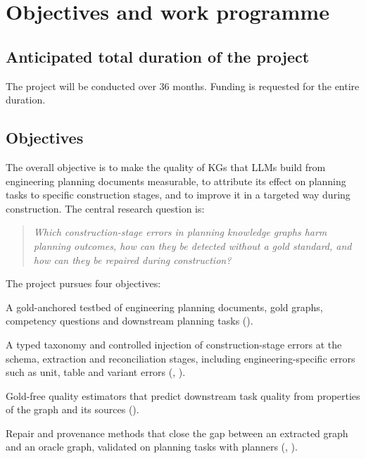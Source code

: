 \section{Objectives and work programme}

\subsection{Anticipated total duration of the project}

The project will be conducted over 36 months. Funding is requested for the entire duration.

\subsection{Objectives}

The overall objective is to make the quality of \acp{KG} that \acp{LLM} build from engineering planning documents measurable, to attribute its effect on planning tasks to specific construction stages, and to improve it in a targeted way during construction. The central research question is:

\begin{quote}
\itshape Which construction-stage errors in planning knowledge graphs harm planning outcomes, how can they be detected without a gold standard, and how can they be repaired during construction?
\end{quote}

The project pursues four objectives:
\begin{description}[leftmargin=1.1cm, style=sameline, itemsep=1pt]
  \item[O1] A gold-anchored testbed of engineering planning documents, gold graphs, competency questions and downstream planning tasks ().
  \item[O2] A typed taxonomy and controlled injection of construction-stage errors at the schema, extraction and reconciliation stages, including engineering-specific errors such as unit, table and variant errors (, ).
  \item[O3] Gold-free quality estimators that predict downstream task quality from properties of the graph and its sources ().
  \item[O4] Repair and provenance methods that close the gap between an extracted graph and an oracle graph, validated on planning tasks with planners (, ).
\end{description}

